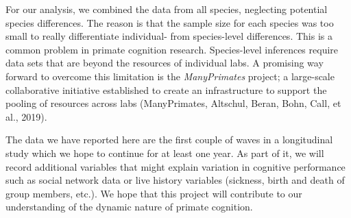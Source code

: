 \documentclass[10pt, letterpaper]{article}
\begin{document}
For our analysis, we combined the data from all species, neglecting
potential species differences. The reason is that the sample size for
each species was too small to really differentiate individual- from
species-level differences. This is a common problem in primate cognition
research. Species-level inferences require data sets that are beyond the
resources of individual labs. A promising way forward to overcome this
limitation is the \emph{ManyPrimates} project; a large-scale
collaborative initiative established to create an infrastructure to
support the pooling of resources across labs (ManyPrimates, Altschul,
Beran, Bohn, Call, et al., 2019).

The data we have reported here are the first couple of waves in a
longitudinal study which we hope to continue for at least one year. As
part of it, we will record additional variables that might explain
variation in cognitive performance such as social network data or live
history variables (sickness, birth and death of group members, etc.). We
hope that this project will contribute to our understanding of the
dynamic nature of primate cognition.
\end{document}
